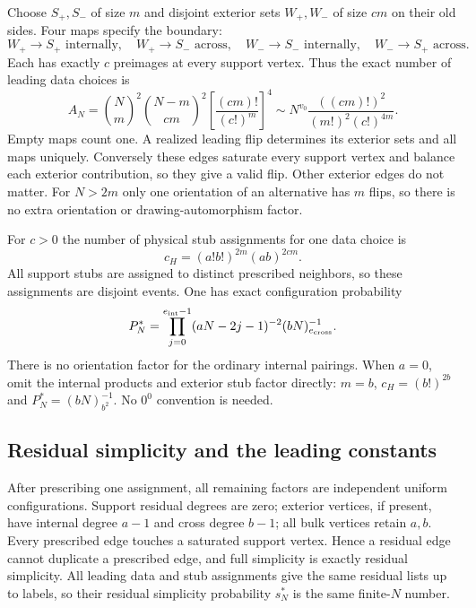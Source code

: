 Choose $S_+,S_-$ of size $m$ and disjoint exterior sets $W_+,W_-$
of size $cm$ on their old sides. Four maps specify the boundary:
\[
 W_+\to S_+\text{ internally},\quad W_+\to S_-\text{ across},\quad
 W_-\to S_-\text{ internally},\quad W_-\to S_+\text{ across}.
\]
Each has exactly $c$ preimages at every support vertex. Thus the
exact number of leading data choices is
\begin{equation}\label{ap:eq:data}
 A_N=\binom Nm^2\binom{N-m}{cm}^2
       \left[\frac{(cm)!}{(c!)^m}\right]^4
 \sim N^{v_0}\frac{((cm)!)^2}{(m!)^2(c!)^{4m}}.
\end{equation}
Empty maps count one. A realized leading flip determines its exterior
sets and all maps uniquely. Conversely these edges saturate every
support vertex and balance each exterior contribution, so they give
a valid flip. Other exterior edges do not matter. For $N>2m$ only
one orientation of an alternative has $m$ flips, so there is no
extra orientation or drawing-automorphism factor.

For $c>0$ the number of physical stub assignments for one data choice is
\[
 c_H=(a!b!)^{2m}(ab)^{2cm}.
\]
All support stubs are assigned to distinct prescribed neighbors, so
these assignments are disjoint events. One has exact configuration
probability
\begin{equation}\label{ap:eq:prescribed}
 P_N^*=\prod_{j=0}^{e_{\rm int}-1}(aN-2j-1)^{-2}
                         (bN)_{e_{\rm cross}}^{-1}.
\end{equation}
There is no orientation factor for the ordinary internal pairings.
When $a=0$, omit the internal products and exterior stub factor
directly: $m=b$, $c_H=(b!)^{2b}$ and
$P_N^*=(bN)_{b^2}^{-1}$. No $0^0$ convention is needed.

\subsection{Residual simplicity and the leading constants}
After prescribing one assignment, all remaining factors are independent
uniform configurations. Support residual degrees are zero; exterior
vertices, if present, have internal degree $a-1$ and cross degree
$b-1$; all bulk vertices retain $a,b$. Every prescribed edge touches
a saturated support vertex. Hence a residual edge cannot duplicate
a prescribed edge, and full simplicity is exactly residual simplicity.
All leading data and stub assignments give the same residual lists
up to labels, so their residual simplicity probability $s_N^*$ is
the same finite-$N$ number.


